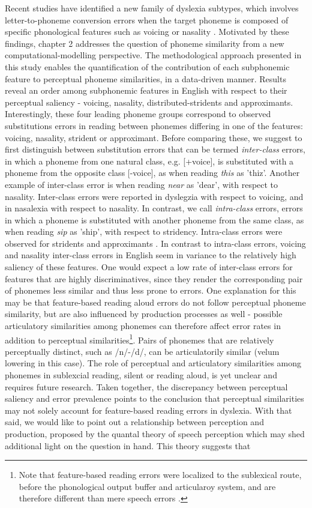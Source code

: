 Recent studies have identified a new family of dyslexia subtypes, which involves letter-to-phoneme conversion errors when the target phoneme is composed of specific phonological features such as voicing or nasality \cite{Gvion2010, Gvion2012, kf11}. Motivated by these findings, chapter 2 addresses the question of phoneme similarity from a new computational-modelling perspective. The methodological approach presented in this study enables the quantification of the contribution of each subphonemic feature to perceptual phoneme similarities, in a data-driven manner. Results reveal an order among subphonemic features in English with respect to their perceptual saliency - voicing, nasality, distributed-stridents and approximants. Interestingly, these four leading phoneme groups correspond to observed substitutions errors in reading between phonemes differing in one of the features: voicing, nasality, strident or approximant. Before comparing these, we suggest to first distinguish between substitution errors that can be termed \textit{inter-class} errors, in which a phoneme from one natural class, e.g. [+voice], is substituted with a phoneme from the opposite class [-voice], as when reading {\it this} as 'thiz'. Another example of inter-class error is when reading {\it near} as 'dear', with respect to nasality. Inter-class errors were reported in dyslegzia with respect to voicing, and in nasalexia with respect to nasality. In contrast, we call \textit{intra-class} errors, errors in which a phoneme is substituted with another phoneme from the same class, as when reading {\it sip} as 'ship', with respect to stridency. Intra-class errors were observed for stridents and approximants \citep[unpublished]{friedmann}. In contrast to intra-class errors, voicing and nasality inter-class errors in English seem in variance to the relatively high saliency of these features. One would expect a low rate of inter-class errors for features that are highly discriminatives, since they render the corresponding pair of phonemes less similar and thus less prone to errors. One explanation for this may be that feature-based reading aloud errors do not follow perceptual phoneme similarity, but are also influenced by production processes as well - possible articulatory similarities among phonemes can therefore affect error rates in addition to perceptual similarities\footnote{Note that feature-based reading errors were localized to the sublexical route, before the phonological output buffer and articularoy system, and are therefore different than mere speech errors \citep{Gvion2010}.}. Pairs of phonemes that are relatively perceptually distinct, such as /n/-/d/, can be articulatorily similar (velum lowering in this case). The role of perceptual and articulatory similarities among phonemes in sublexcial reading, silent or reading aloud, is yet unclear and requires future research. Taken together, the discrepancy between perceptual saliency and error prevalence points to the conclusion that perceptual similarities may not solely account for feature-based reading errors in dyslexia. With that said, we would like to point out a relationship between perception and production, proposed by the quantal theory of speech perception which may shed additional light on the question in hand. This theory suggests that 
